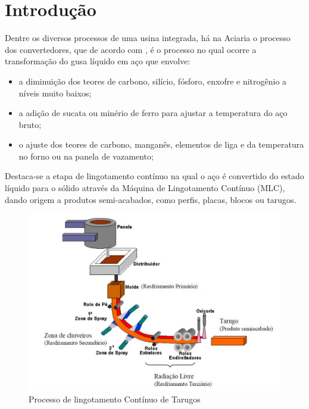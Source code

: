 \chapter[Introdução]{Introdução}
 
 
 Dentre os diversos processos de uma usina integrada, há na Aciaria o processo dos convertedores, que de acordo com \cite{machado2003siderurgia}, é o processo no qual ocorre a transformação do gusa líquido em aço que envolve:

\begin{itemize}
	\item a diminuição dos teores de carbono, silício, fósforo, enxofre e nitrogênio a níveis muito baixos;
	\item a adição de sucata ou minério de ferro para ajustar a temperatura do aço bruto;
	\item o ajuste dos teores de carbono, manganês, elementos de liga e da temperatura no forno ou na panela de vazamento;
\end{itemize}

Destaca-se a etapa de lingotamento contínuo na qual o aço é convertido do estado líquido para o sólido através da Máquina de Lingotamento Contínuo (MLC), dando origem a produtos semi-acabados, como perfis, placas, blocos ou tarugos.

\begin{figure}[htbp]
	\centering
	\includegraphics[width=0.8\linewidth]{figuras/Steel/artigo_2.png}
	\caption{Processo de lingotamento Contínuo de Tarugos}
	\label{fig:processLing}
\end{figure}

